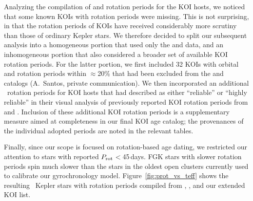 \documentclass[11pt,twocolumn,tighten]{aastex63}
\begin{document}
Analyzing the compilation of  and
 rotation periods for the KOI hosts, we
noticed that some known KOIs with rotation periods were missing.
This is not surprising, in that the rotation periods of KOIs have
received considerably more scrutiny than those of ordinary Kepler
stars.
We therefore decided to split our subsequent analysis into a
homogeneous portion that used only the  and
 data, and an inhomogeneous portion that also
considered a broader set of available KOI rotation periods.
For the latter portion, we first included 32 KOIs with orbital and
rotation periods within $\approx$20\% that had been
excluded %
from the
 and  catalogs
(A.~Santos, private communication).
We then incorporated an additional \nnewdavidtwentyone\ rotation
periods for KOI hosts that
\citet{David_2021} had described as either ``reliable'' or ``highly
reliable'' in their visual analysis of previously reported KOI
rotation periods from \citet{McQuillan_2013,Walkowicz_2013,Mazeh_2015}
and \citet{Angus_2018}.
Inclusion of these additional KOI rotation periods is a
supplementary measure aimed at completeness in our final KOI age
catalog; the provenances of the individual adopted periods are 
noted in the relevant tables.

Finally, since our scope is focused on rotation-based age dating, 
we restricted our attention to stars with reported $P_{\rm
rot}$$<$45\,days.
FGK stars with slower rotation periods spin much slower than the stars
in the oldest open clusters currently used to calibrate our 
gyrochronology model.
Figure~\ref{fig:prot_vs_teff} shows the resulting
\nuniqstarsantosrot\ Kepler stars with rotation periods 
compiled from
, , and our extended
KOI list.
\end{document}
